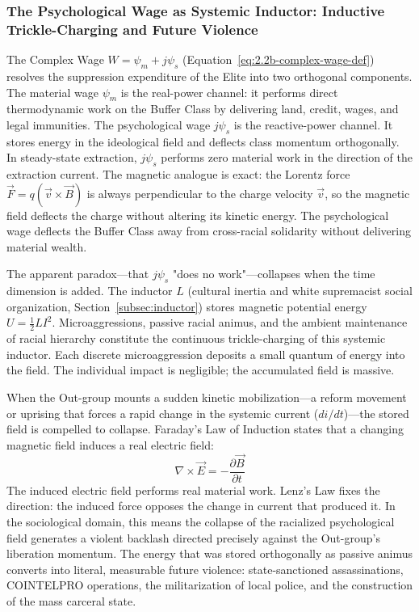 \subsubsection{The Psychological Wage as Systemic Inductor: Inductive Trickle-Charging and Future Violence}

The Complex Wage $W = \psi_m + j\psi_s$ (Equation~\ref{eq:2.2b-complex-wage-def}) resolves the suppression expenditure of the Elite into two orthogonal components. The material wage $\psi_m$ is the real-power channel: it performs direct thermodynamic work on the Buffer Class by delivering land, credit, wages, and legal immunities. The psychological wage $j\psi_s$ is the reactive-power channel. It stores energy in the ideological field and deflects class momentum orthogonally. In steady-state extraction, $j\psi_s$ performs zero material work in the direction of the extraction current. The magnetic analogue is exact: the Lorentz force $\vec{F} = q(\vec{v} \times \vec{B})$ is always perpendicular to the charge velocity $\vec{v}$, so the magnetic field deflects the charge without altering its kinetic energy. The psychological wage deflects the Buffer Class away from cross-racial solidarity without delivering material wealth.

The apparent paradox---that $j\psi_s$ "does no work"---collapses when the time dimension is added. The inductor $L$ (cultural inertia and white supremacist social organization, Section~\ref{subsec:inductor}) stores magnetic potential energy $U = \frac{1}{2}LI^2$. Microaggressions, passive racial animus, and the ambient maintenance of racial hierarchy constitute the continuous trickle-charging of this systemic inductor. Each discrete microaggression deposits a small quantum of energy into the field. The individual impact is negligible; the accumulated field is massive.

When the Out-group mounts a sudden kinetic mobilization---a reform movement or uprising that forces a rapid change in the systemic current ($di/dt$)---the stored field is compelled to collapse. Faraday's Law of Induction states that a changing magnetic field induces a real electric field:
\begin{equation}\label{eq:1.7c-faraday-induction}
\nabla \times \vec{E} = -\frac{\partial \vec{B}}{\partial t}
\end{equation}
The induced electric field performs real material work. Lenz's Law fixes the direction: the induced force opposes the change in current that produced it. In the sociological domain, this means the collapse of the racialized psychological field generates a violent backlash directed precisely against the Out-group's liberation momentum. The energy that was stored orthogonally as passive animus converts into literal, measurable future violence: state-sanctioned assassinations, COINTELPRO operations, the militarization of local police, and the construction of the mass carceral state.

